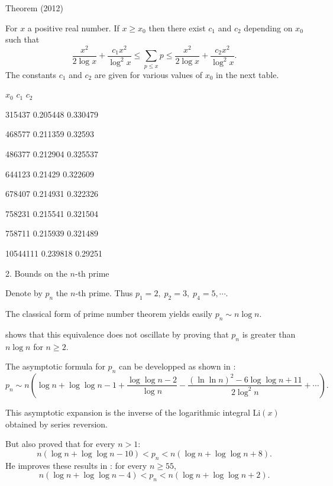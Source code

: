 \begin{thm}{Theorem (2012)}

For $x$ a positive real number. If $x \geq x_0$ then there exist $c_1$
and $c_2$ depending on $x_0$ such that
$$
\frac{x^2}{2\log{x}} +
\frac{c_1 x^2}{\log^2{x}} \leq \sum_{p \leq x} p \leq
\frac{x^2}{2\log{x}} + \frac{c_2 x^2}{\log^2{x}}.
$$
The constants
$c_1$ and $c_2$ are given for various values of $x_0$ in the next
table.

  
  
    
      $x_0$
      $c_1$
      $c_2$
    
  
  
    315437
    0.205448
    0.330479
  
  
    468577
    0.211359
    0.32593
  
  
    486377
    0.212904
    0.325537
  
  
    644123
    0.21429
    0.322609
  
  
    678407
    0.214931
    0.322326
  
  
    758231
    0.215541
    0.321504
  
  
    758711
    0.215939
    0.321489
  
  
    10544111
    0.239818
    0.29251
  
  





  


  
2. Bounds on the $n$-th prime



Denote by $p_n$  the $n$-th prime. Thus $p_1=2,\;p_2=3,\; p_4=5,\cdots$.

The classical form of prime number theorem yields easily
$p_n \sim n \log n.$ 

\cite{Rosser*38}
shows that this equivalence does not oscillate
by proving that $p_n$ is greater than $n\log n$ for $n\geq 2$.  


The asymptotic formula for $p_n$ can be developped as shown in
\cite{Cipolla*02}:
$$
p_n\sim n\left(\log n+\log\log n -1+\frac{\log\log n-2}{\log n}
-\frac{(\ln\ln n)^2-6\log\log n +11}{2\log^2 n}+\cdots\right).
$$

This asymptotic expansion is the inverse of the logarithmic integral
$\mbox{Li}(x)$ obtained by series reversion. 


 But
\cite{Rosser*38}
also proved  that for every $n> 1$:
$$
n (\log n + \log \log n - 10) < p_n < n (\log n + \log\log n +8).
$$
He improves these results in
\cite{Rosser*41}
:  for every $n\geq 55$,
$$
n (\log n + \log \log n - 4) < p_n < n (\log n + \log\log n +2).
$$


\end{thm}
